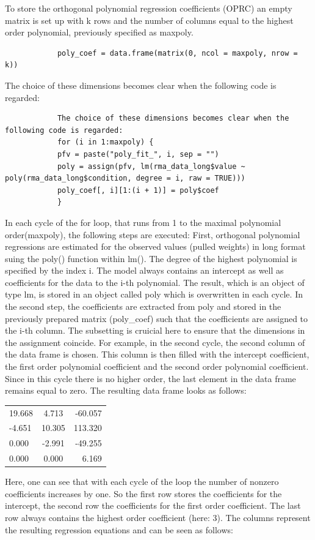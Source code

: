 \documentclass[11pt]{article}
\begin{document}
		To store the orthogonal polynomial regression coefficients (OPRC) an empty matrix is set up with k rows and the number of columns equal to the highest order polynomial, previously specified as maxpoly.
		
		\begin{lstlisting}
			poly_coef = data.frame(matrix(0, ncol = maxpoly, nrow = k))	
		\end{lstlisting}
		
		The choice of these dimensions becomes clear when the following code is regarded:
		
		\begin{lstlisting}
			The choice of these dimensions becomes clear when the following code is regarded:
			for (i in 1:maxpoly) {
			pfv = paste("poly_fit_", i, sep = "")
			poly = assign(pfv, lm(rma_data_long$value ~ poly(rma_data_long$condition, degree = i, raw = TRUE)))
			poly_coef[, i][1:(i + 1)] = poly$coef
			}	
		\end{lstlisting}
		
		
		In each cycle of the for loop, that runs from 1 to the maximal polynomial order(maxpoly), the following steps are executed:
		First, orthogonal polynomial regressions are estimated for the observed values (pulled weights) in long format suing the poly() function within lm(). The degree of the highest polynomial is specified by the index i. The model always contains an intercept as well as coefficients for the data to the i-th polynomial. The result, which is an object of type lm, is stored in an object called poly which is overwritten in each cycle.
		In the second step, the coefficients are extracted from poly and stored in the previously prepared matrix (poly\_coef) such that the coefficients are assigned to the i-th column. The subsetting is cruicial here to ensure that the dimensions in the assignment coincide. For example, in the second cycle, the second column of the data frame is chosen. This column is then filled with the intercept coefficient, the first order polynomial coefficient and the second order polynomial coefficient. Since in this cycle there is no higher order, the last element in the data frame remains equal to zero. The resulting data frame looks as follows:
		
		\begin{center}
			\begin{tabular}{ l | c | r }
				19.668 & 4.713  & -60.057 \\
				-4.651  & 10.305  & 113.320\\
				0.000 & -2.991  & -49.255 \\
				0.000 & 0.000  &  6.169 \\
			\end{tabular}
		\end{center}
		Here, one can see that with each cycle of the loop the number of nonzero coefficients increases by one. So the first row stores the coefficients for the intercept, the second row the coefficients for the first order coefficient. The last row always contains the highest order coefficient (here: 3). The columns represent the resulting regression equations and can be seen as follows:\\
		
\end{document}
